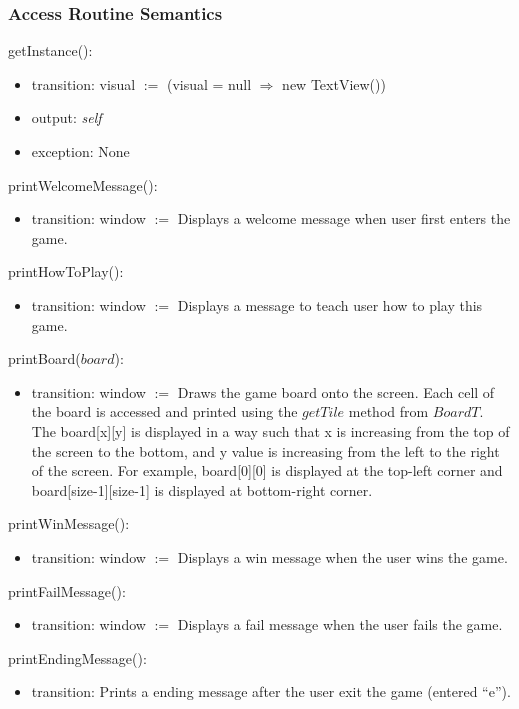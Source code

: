 \documentclass[12pt]{article}
\begin{document}
\subsubsection* {Access Routine Semantics}

\noindent getInstance():
\begin{itemize}
  \item transition: visual $:=$ (visual = null $\Rightarrow$ new TextView())
  \item output: \textit{self}
  \item exception: None
\end{itemize}

\noindent printWelcomeMessage():
\begin{itemize}
\item transition: window $:=$ Displays a welcome message when user first enters the game.
\end{itemize}

\noindent printHowToPlay():
\begin{itemize}
\item transition: window $:=$ Displays a message to teach user how to play this game.
\end{itemize}

\noindent printBoard($board$):
\begin{itemize}
\item transition: window $:=$ Draws the game board onto the screen. Each cell of the board is accessed and printed using the $getTile$ method from $BoardT$. The board[x][y] is displayed in a way such that x is increasing from the top of the screen to the bottom, and y value is increasing from the left to the right of the screen. For example, board[0][0] is displayed at the top-left corner and board[size-1][size-1] is displayed at bottom-right corner. 
\end{itemize}

\noindent printWinMessage():
\begin{itemize}
\item transition: window $:=$ Displays a win message when the user wins the game.
\end{itemize}

\noindent printFailMessage():
\begin{itemize}
\item transition: window $:=$ Displays a fail message when the user fails the game.
\end{itemize}

\noindent printEndingMessage():
\begin{itemize}
\item transition: Prints a ending message after the user exit the game (entered ``e'').
\end{itemize}
\end{document}
